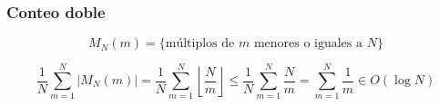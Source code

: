 \begin{frame}
  \frametitle{Conteo doble}

  \[
    M_N(m) = \{ \text{múltiplos de } m \text{ menores o iguales a } N \}
  \]

  \[
    \frac{1}{N} \sum_{m=1}^{N} |M_N(m)|
    = \frac{1}{N} \sum_{m=1}^{N} \left\lfloor \frac{N}{m} \right\rfloor
    \leq \frac{1}{N} \sum_{m=1}^{N} \frac{N}{m}
    = \sum_{m=1}^{N} \frac{1}{m}
    \in O(\log N)
  \]
\end{frame}
